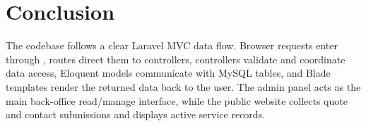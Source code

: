 \documentclass[11pt,a4paper]{article}
\begin{document}
\section{Conclusion}

The codebase follows a clear Laravel MVC data flow. Browser requests enter through , routes direct them to controllers, controllers validate and coordinate data access, Eloquent models communicate with MySQL tables, and Blade templates render the returned data back to the user. The admin panel acts as the main back-office read/manage interface, while the public website collects quote and contact submissions and displays active service records.
\end{document}
